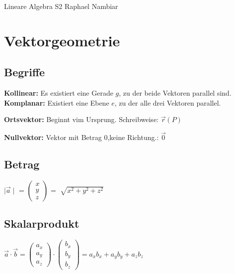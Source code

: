



\begin{multicols*}{3}

    \DocumentInfo
    {Lineare Algebra S2} %
    {Raphael Nambiar} %

    \WhiteSpace

    \section{Vektorgeometrie}
    \subsection{Begriffe}
    {\textbf{Kollinear:} Es existiert eine Gerade $g$, zu der beide Vektoren parallel sind.}
    {\textbf{Komplanar:} Existiert eine Ebene $e$, zu der alle drei Vektoren parallel.}

    {\textbf{Ortsvektor:} Beginnt vim Ursprung. Schreibweise: $\vec{r}(P) $}

    {\textbf{Nullvektor:} Vektor mit Betrag 0,keine Richtung.:  $\vec{0} $}
    \WhiteSpace
    \subsection{Betrag}
    {
        $\mid \vec{a} \mid  $ =
        $\begin{pmatrix}
                x \\
                y \\
                z
            \end{pmatrix}$ = $ \sqrt[]{x^2+y^2+z^2}$
        \WhiteSpace
        \subsection{Skalarprodukt}

        $\vec{a} \cdot \vec{b} =  \begin{pmatrix}
                a_x \\
                a_y \\
                a_z
            \end{pmatrix} \cdot \begin{pmatrix}
                b_x \\
                b_y \\
                b_z
            \end{pmatrix} = a_xb_x+a_yb_y+a_zb_z$

}
\end{multicols*}
